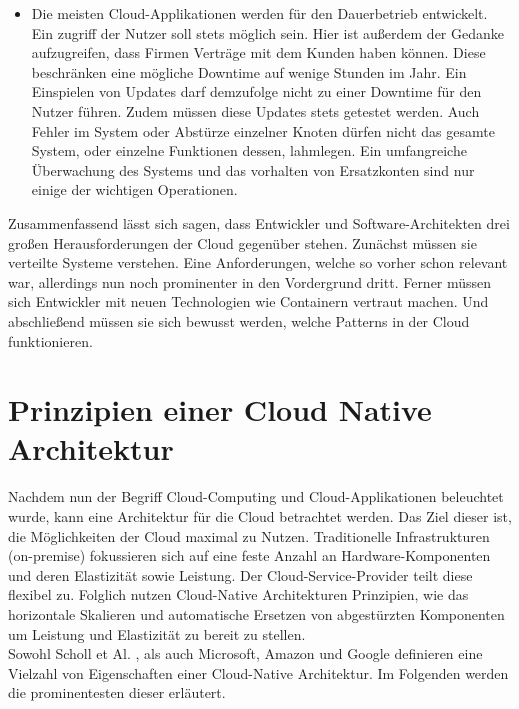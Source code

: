 \begin{itemize}
    \item Die meisten Cloud-Applikationen werden für den Dauerbetrieb entwickelt. Ein zugriff der Nutzer soll stets möglich sein. Hier ist außerdem der Gedanke aufzugreifen, dass Firmen  Verträge mit dem Kunden haben können. Diese beschränken eine mögliche Downtime auf wenige Stunden im Jahr. Ein Einspielen von Updates darf demzufolge nicht zu einer Downtime für den Nutzer führen. Zudem müssen diese Updates stets getestet werden. Auch Fehler im System oder Abstürze einzelner Knoten dürfen nicht das gesamte System, oder einzelne Funktionen dessen, lahmlegen. Ein umfangreiche Überwachung des Systems und das vorhalten von Ersatzkonten sind nur einige der wichtigen Operationen.\cite{gannon_cloud-native_2017}
\end{itemize}
Zusammenfassend lässt sich sagen, dass Entwickler und Software-Architekten drei großen Herausforderungen der Cloud gegenüber stehen. Zunächst müssen sie verteilte Systeme verstehen. Eine Anforderungen, welche so vorher schon relevant war, allerdings nun noch prominenter in den Vordergrund dritt. Ferner müssen sich Entwickler mit neuen Technologien wie Containern vertraut machen. Und abschließend müssen sie sich bewusst werden, welche Patterns in der Cloud funktionieren.

\section{Prinzipien einer Cloud Native Architektur}
Nachdem nun der Begriff Cloud-Computing und Cloud-Applikationen beleuchtet wurde, kann eine Architektur für die Cloud betrachtet werden. Das Ziel dieser ist, die Möglichkeiten der Cloud maximal zu Nutzen. Traditionelle Infrastrukturen (on-premise) fokussieren sich auf eine feste Anzahl an Hardware-Komponenten und deren Elastizität sowie Leistung. Der Cloud-Service-Provider teilt diese flexibel zu. Folglich nutzen Cloud-Native Architekturen Prinzipien, wie das horizontale Skalieren und automatische Ersetzen von abgestürzten Komponenten um Leistung und Elastizität zu bereit zu stellen.\\
Sowohl Scholl et Al.\cite{scholl_cloud_2019} , als auch Microsoft, Amazon und Google definieren eine Vielzahl von Eigenschaften einer Cloud-Native Architektur. Im Folgenden werden die prominentesten dieser erläutert. 
